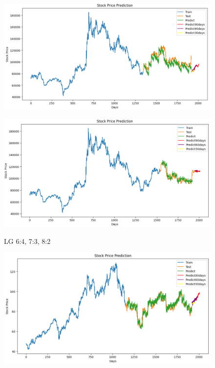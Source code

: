\documentclass{article}
\begin{document}
\begin{multicols}{2}
\begin{figure}[H]
\begin{minipage}{0.15\textwidth}
    \label{fig:1}
    \end{minipage}%
    \begin{minipage}{0.15\textwidth}
    \centering
    \includegraphics[width=1\textwidth]{Image/NBeat/N_BEAT_LG_7_3.png}
  
    \label{fig:2}
    \end{minipage}%
    \begin{minipage}{0.15\textwidth}
    \centering
    \includegraphics[width=1\textwidth]{Image/NBeat/N_BEAT_LG_8_2.png}

    \label{fig:3}
    \end{minipage}
    \caption{LG   6:4, 7:3, 8:2 }
\end{figure}



\begin{figure}[H]
    \centering
    \begin{minipage}{0.15\textwidth}
    \centering
    \includegraphics[width=1\textwidth]{Image/NBeat/N_BEAT_SONY_6_4.png}
   

\end{minipage}
\end{figure}
\end{multicols}
\end{document}
